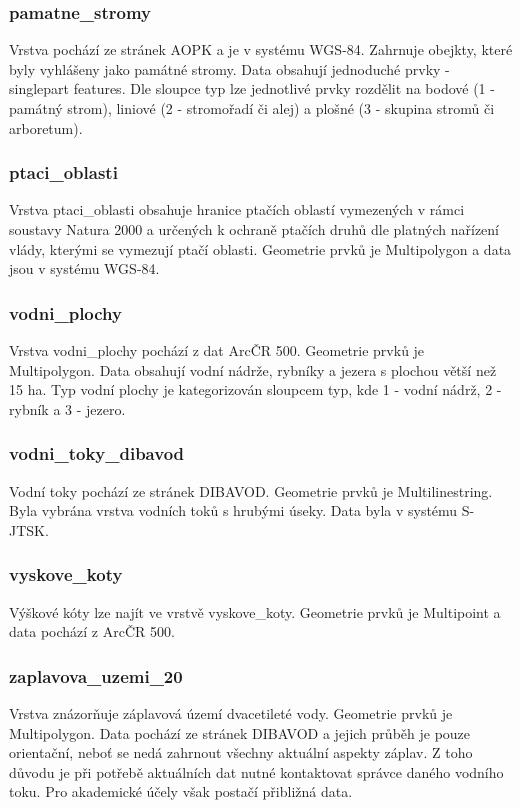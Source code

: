 \documentclass[a4paper, 12pt]{article}
\begin{document}
\subsubsection{pamatne\_stromy}
Vrstva pochází ze stránek AOPK a je v systému WGS-84. Zahrnuje obejkty, které byly vyhlášeny jako památné stromy. Data obsahují jednoduché prvky - singlepart features. Dle sloupce typ lze jednotlivé prvky rozdělit na bodové (1 - památný strom), liniové (2 - stromořadí či alej) a plošné (3 - skupina stromů či arboretum).

\subsubsection{ptaci\_oblasti}
Vrstva ptaci\_oblasti obsahuje hranice ptačích oblastí vymezených v rámci soustavy Natura 2000 a určených k ochraně ptačích druhů dle platných nařízení vlády, kterými se vymezují ptačí oblasti. Geometrie prvků je Multipolygon a data jsou v systému WGS-84. 

\subsubsection{vodni\_plochy}
Vrstva vodni\_plochy pochází z dat ArcČR 500. Geometrie prvků je Multipolygon. Data obsahují vodní nádrže, rybníky a jezera s plochou větší než 15 ha. Typ vodní plochy je kategorizován sloupcem typ, kde 1 - vodní nádrž, 2 - rybník a 3 - jezero. 

\subsubsection{vodni\_toky\_dibavod}
Vodní toky pochází ze stránek DIBAVOD. Geometrie prvků je Multilinestring. Byla vybrána vrstva vodních toků s hrubými úseky. Data byla v systému S-JTSK. 


\subsubsection{vyskove\_koty}
Výškové kóty lze najít ve vrstvě vyskove\_koty. Geometrie prvků je Multipoint a data pochází z ArcČR 500. 

\subsubsection{zaplavova\_uzemi\_20}
Vrstva znázorňuje záplavová území dvacetileté vody. Geometrie prvků je Multipolygon. Data pochází ze stránek DIBAVOD a jejich průběh je pouze orientační, neboť se nedá zahrnout všechny aktuální aspekty záplav. Z toho důvodu je při potřebě aktuálních dat nutné kontaktovat správce daného vodního toku. Pro akademické účely však postačí přibližná data.
\end{document}
